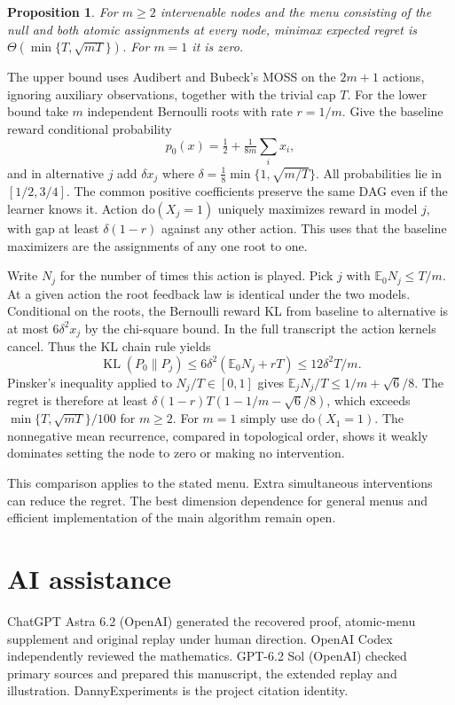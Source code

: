 \documentclass[11pt,a4paper]{amsart}
\newtheorem{proposition}[theorem]{Proposition}
\newcommand{\E}{\mathbb E}
\newcommand{\KL}{\operatorname{KL}}
\begin{document}
\begin{proposition}
For $m\geq2$ intervenable nodes and the menu consisting of the null and both atomic assignments at every node, minimax expected regret is $\Theta(\min\{T,\sqrt{mT}\})$. For $m=1$ it is zero.
\end{proposition}

The upper bound uses Audibert and Bubeck's MOSS \cite[Theorem 5]{moss} on the $2m+1$ actions, ignoring auxiliary observations, together with the trivial cap $T$. For the lower bound take $m$ independent Bernoulli roots with rate $r=1/m$. Give the baseline reward conditional probability
\[
 p_0(x)=\tfrac12+\tfrac1{8m}\sum_i x_i ,
\]
and in alternative $j$ add $\delta x_j$ where
$\delta=\tfrac18\min\{1,\sqrt{m/T}\}$.
All probabilities lie in $[1/2,3/4]$. The common positive coefficients preserve the same DAG even if the learner knows it. Action $\mathrm{do}(X_j=1)$ uniquely maximizes reward in model $j$, with gap at least $\delta(1-r)$ against any other action. This uses that the baseline maximizers are the assignments of any one root to one.

Write $N_j$ for the number of times this action is played. Pick $j$ with $\E_0N_j\leq T/m$. At a given action the root feedback law is identical under the two models. Conditional on the roots, the Bernoulli reward KL from baseline to alternative is at most $6\delta^2 x_j$ by the chi-square bound. In the full transcript the action kernels cancel. Thus the KL chain rule yields
\[
        \KL(P_0\|P_j)\leq6\delta^2(\E_0N_j+rT)
                      \leq12\delta^2T/m.
\]
Pinsker's inequality applied to $N_j/T\in[0,1]$ gives
$\E_j N_j/T\leq 1/m+\sqrt6/8$. The regret is therefore at least
$\delta(1-r)T(1-1/m-\sqrt6/8)$, which exceeds
$\min\{T,\sqrt{mT}\}/100$ for $m\geq2$.
For $m=1$ simply use $\mathrm{do}(X_1=1)$. The nonnegative mean recurrence, compared in topological order, shows it weakly dominates setting the node to zero or making no intervention.

This comparison applies to the stated menu. Extra simultaneous interventions can reduce the regret. The best dimension dependence for general menus and efficient implementation of the main algorithm remain open.

\section*{AI assistance}
ChatGPT Astra 6.2 (OpenAI) generated the recovered proof, atomic-menu supplement and original replay under human direction. OpenAI Codex independently reviewed the mathematics. GPT-6.2 Sol (OpenAI) checked primary sources and prepared this manuscript, the extended replay and illustration. DannyExperiments is the project citation identity.



\end{document}
